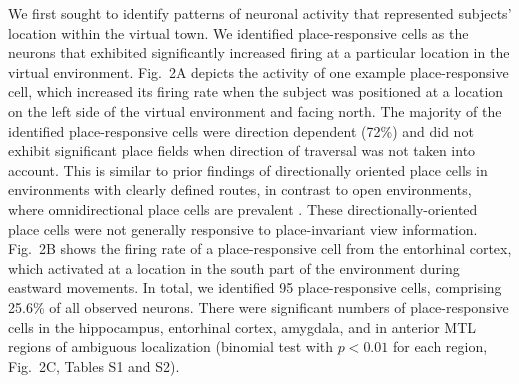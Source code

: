 % 
We first sought to identify patterns of neuronal activity that represented subjects' location within the virtual town. We identified place-responsive cells as the neurons that exhibited significantly increased firing at a particular location in the virtual environment. Fig.~2A depicts the activity of one example place-responsive cell, which increased its firing rate when the subject was positioned at a location on the left side of the virtual environment and facing north.  The majority of the identified place-responsive cells were direction dependent (72\%) and did not exhibit significant place fields when direction of traversal was not taken into account.  This is similar to prior findings of directionally oriented place cells in environments with clearly defined routes, in contrast to open environments, where omnidirectional place cells are prevalent \cite{MullEtal94,EkstEtal03}.  These directionally-oriented place cells were not generally responsive to place-invariant view information. Fig.~2B shows the firing rate of a place-responsive cell from the entorhinal cortex, which activated at a location in the south part of the environment during eastward movements.  In total, we identified 95 place-responsive cells, comprising 25.6\% of all observed neurons. There were significant numbers of place-responsive cells in the hippocampus, entorhinal cortex, amygdala, and in anterior MTL regions of ambiguous localization (binomial test with $p<0.01$ for each region, Fig.~2C, Tables S1 and S2).

